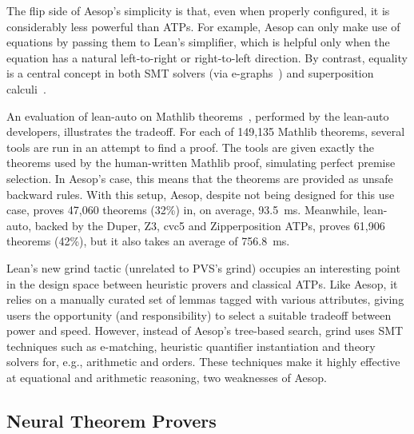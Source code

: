 The flip side of Aesop's simplicity is that, even when properly configured, it is considerably less powerful than ATPs.
For example, Aesop can only make use of equations by passing them to Lean's simplifier, which is helpful only when the equation has a natural left-to-right or right-to-left direction.
By contrast, equality is a central concept in both SMT solvers (via e-graphs~\cite{EMatching}) and superposition calculi~\cite{Superposition}.

An evaluation of lean-auto on Mathlib theorems~\cite{lean-auto}, performed by the lean-auto developers, illustrates the tradeoff.
For each of 149,135 Mathlib theorems, several tools are run in an attempt to find a proof.
The tools are given exactly the theorems used by the human-written Mathlib proof, simulating perfect premise selection.
In Aesop's case, this means that the theorems are provided as unsafe backward rules.
With this setup, Aesop, despite not being designed for this use case, proves 47,060 theorems (32\%) in, on average, \SI{93.5}{ms}.
Meanwhile, lean-auto, backed by the Duper, Z3, cvc5 and Zipperposition ATPs, proves 61,906 theorems (42\%), but it also takes an average of \SI{756.8}{ms}.

Lean's new grind tactic (unrelated to PVS's grind) occupies an interesting point in the design space between heuristic provers and classical ATPs.
Like Aesop, it relies on a manually curated set of lemmas tagged with various attributes, giving users the opportunity (and responsibility) to select a suitable tradeoff between power and speed.
However, instead of Aesop's tree-based search, grind uses SMT techniques such as e-matching, heuristic quantifier instantiation and theory solvers for, e.g., arithmetic and orders.
These techniques make it highly effective at equational and arithmetic reasoning, two weaknesses of Aesop.

\subsection{Neural Theorem Provers}

